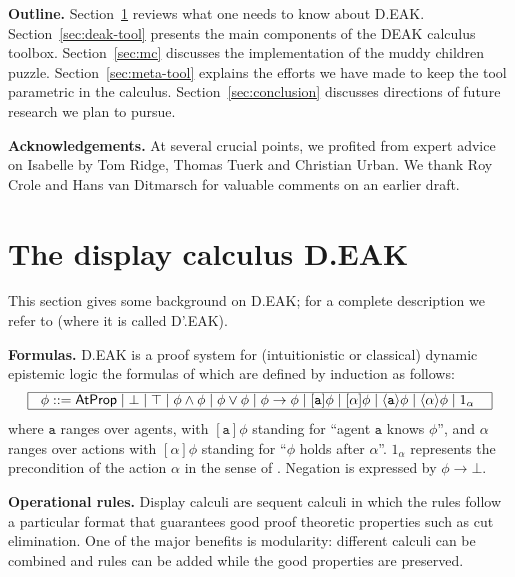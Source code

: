 \documentclass[runningheads,a4paper]{llncs}
\def\aga{\texttt{a}}
\begin{document}
\medskip\noindent\textbf{Outline. } Section~\ref{sec:deak}  reviews what one needs to know about D.EAK. Section~\ref{sec:deak-tool} presents the main components of the DEAK calculus toolbox. Section~\ref{sec:mc} discusses the implementation of the muddy children puzzle. Section~\ref{sec:meta-tool} explains the efforts we have made to keep the tool parametric in the calculus. Section~\ref{sec:conclusion} discusses directions of future research we plan to pursue.

\medskip\noindent\textbf{Acknowledgements. }  At several crucial points, we profited from expert advice on Isabelle by Tom Ridge, Thomas Tuerk and Christian Urban. We thank Roy Crole and Hans van Ditmarsch for valuable comments on an earlier draft.


\section{The display calculus D.EAK}\label{sec:deak}
This section gives some background on D.EAK; for a complete description we refer to \cite{DEAK} (where it is called D'.EAK). 

\newcommand{\Fma}{\phi}
\medskip\noindent\textbf{Formulas.} D.EAK is a proof system for (intuitionistic or classical) dynamic epistemic logic the formulas of which are defined by induction as follows:
\begin{equation}\label{eq:fma}
\begin{tabular}{|c|}
\hline
$\ \Fma ::= \textsf{AtProp} \mid \bot \mid \top \mid \Fma \wedge \Fma \mid \Fma \vee \Fma \mid \Fma\rightarrow\Fma \mid [\aga]\Fma \mid [\alpha]\Fma \mid \langle \aga\rangle\phi \mid \langle \alpha\rangle\phi \mid 1_\alpha\ \ $\\
\hline
\end{tabular}
\end{equation}
where $\aga$ ranges over agents, with $[\aga]\phi$ standing for ``agent $\aga$ knows $\phi$'', and $\alpha$ ranges over actions with $[\alpha]\phi$ standing for ``$\phi$ holds after $\alpha$''. $1_\alpha$ represents the precondition of the action $\alpha$ in the sense of \cite{bms}. Negation is expressed by $\Fma\rightarrow\bot$.

\medskip\noindent\textbf{Operational rules. } Display calculi are sequent calculi in which the rules follow a particular format that guarantees good proof theoretic properties such as cut elimination. One of the major benefits is modularity: different calculi can be combined and rules can be added while the good properties are preserved.
\end{document}
